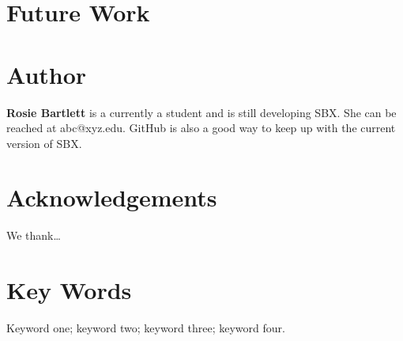\documentclass{cup-ino}
\begin{document}
\section{Future Work}





\printbibliography

\section*{Author}
\begin{authorbio}
\textbf{Rosie Bartlett} is a currently a student and is still developing SBX. She can be reached at abc@xyz.edu. GitHub is also a good way to keep up with the current version of SBX.
\end{authorbio}

\section*{Acknowledgements}
We thank\ldots

\section*{Key Words}
Keyword one; keyword two; keyword three; keyword four.
\end{document}
